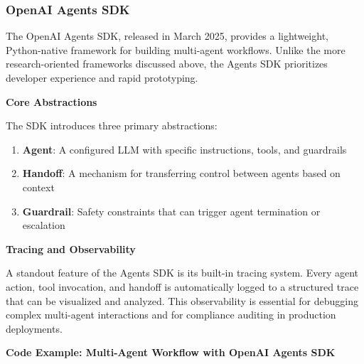 \subsubsection{OpenAI Agents SDK}

The OpenAI Agents SDK, released in March 2025, provides a lightweight, Python-native framework for building multi-agent workflows. Unlike the more research-oriented frameworks discussed above, the Agents SDK prioritizes developer experience and rapid prototyping.

\textbf{Core Abstractions}

The SDK introduces three primary abstractions:

\begin{enumerate}
    \item \textbf{Agent}: A configured LLM with specific instructions, tools, and guardrails
    \item \textbf{Handoff}: A mechanism for transferring control between agents based on context
    \item \textbf{Guardrail}: Safety constraints that can trigger agent termination or escalation

\end{enumerate}
\textbf{Tracing and Observability}

A standout feature of the Agents SDK is its built-in tracing system. Every agent action, tool invocation, and handoff is automatically logged to a structured trace that can be visualized and analyzed. This observability is essential for debugging complex multi-agent interactions and for compliance auditing in production deployments.

\textbf{Code Example: Multi-Agent Workflow with OpenAI Agents SDK}

